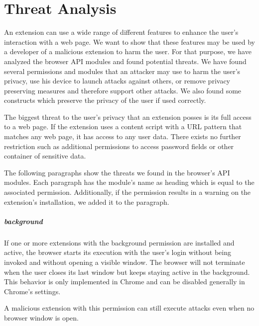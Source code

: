 
\chapter{Threat Analysis}

	An extension can use a wide range of different features to enhance the user's interaction with a web page. We want to show that these features may be used by a developer of a malicious extension to harm the user. For that purpose, we have analyzed the browser API modules and found potential threats. We have found several permissions and modules that an attacker may use to harm the user's privacy, use his device to launch attacks against others, or remove privacy preserving measures and therefore support other attacks. We also found some constructs which preserve the privacy of the user if used correctly.  

	The biggest threat to the user's privacy that an extension posses is its full access to a web page. If the extension uses a content script with a URL pattern that matches any web page, it has access to any user data. There exists no further restriction such as additional permissions to access password fields or other container of sensitive data. 
	
	The following paragraphs show the threats we found in the browser's API modules. Each paragraph has the module's name as heading which is equal to the associated permission. Additionally, if the permission results in a warning on the extension's installation, we added it to the paragraph.
	
\newenvironment{permissionwarning}{%
	\setlength\topsep{4pt}
	\setlength\parskip{0pt}
	\itshape
\begin{center}
	}{%
\end{center}
}

\paragraph{background}
	If one or more extensions with the background permission are installed and active, the browser starts its execution with the user's login without being invoked and without opening a visible window. The browser will not terminate when the user closes its last window but keeps staying active in the background. This behavior is only implemented in Chrome and can be disabled generally in Chrome's settings.
	
	A malicious extension with this permission can still execute attacks even when no browser window is open.
	
